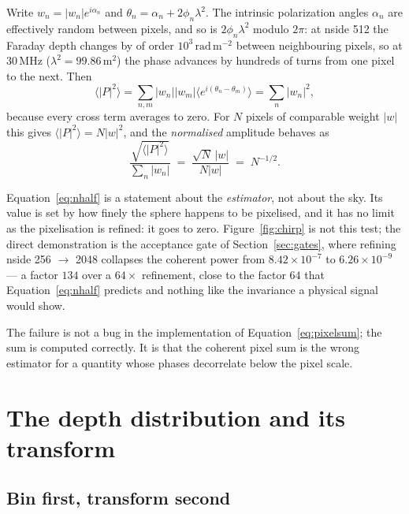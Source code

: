 \documentclass[11pt]{article}
\newcommand{\rmu}{\ensuremath{\mathrm{rad\,m^{-2}}}}
\newcommand{\lamsq}{\ensuremath{\lambda^{2}}}
\begin{document}
Write $w_n = |w_n| e^{i\alpha_n}$ and $\theta_n = \alpha_n +
2\phi_n\lamsq$. The intrinsic polarization angles $\alpha_n$ are
effectively random between pixels, and so is $2\phi_n\lamsq$ modulo
$2\pi$: at nside 512 the Faraday depth changes by of order
$10^{3}$\,\rmu{} between neighbouring pixels, so at 30\,MHz
($\lamsq = 99.86\,\mathrm{m^2}$) the phase advances by hundreds of turns
from one pixel to the next. Then
\begin{equation}
  \bigl\langle |P|^2 \bigr\rangle
  = \sum_{n,m} |w_n||w_m| \bigl\langle e^{i(\theta_n - \theta_m)}
  \bigr\rangle
  = \sum_{n} |w_n|^2 ,
  \label{eq:walk}
\end{equation}
because every cross term averages to zero. For $N$ pixels of comparable
weight $|w|$ this gives $\langle|P|^2\rangle = N|w|^2$, and the
\emph{normalised} amplitude behaves as
\begin{equation}
  \frac{\sqrt{\langle |P|^2\rangle}}{\sum_n |w_n|}
  \;=\; \frac{\sqrt{N}\,|w|}{N|w|}
  \;=\; N^{-1/2}.
  \label{eq:nhalf}
\end{equation}

Equation~\eqref{eq:nhalf} is a statement about the \emph{estimator}, not
about the sky. Its value is set by how finely the sphere happens to be
pixelised, and it has no limit as the pixelisation is refined: it goes to
zero. Figure~\ref{fig:chirp} is not this test; the direct demonstration
is the acceptance gate of Section~\ref{sec:gates}, where refining
nside 256 $\rightarrow$ 2048 collapses the coherent power from
$8.42\times10^{-7}$ to $6.26\times10^{-9}$ --- a factor $134$ over a
$64\times$ refinement, close to the factor $64$ that
Equation~\eqref{eq:nhalf} predicts and nothing like the invariance a
physical signal would show.

The failure is not a bug in the implementation of
Equation~\eqref{eq:pixelsum}; the sum is computed correctly. It is that
the coherent pixel sum is the wrong estimator for a quantity whose phases
decorrelate below the pixel scale.

\section{The depth distribution and its transform}
\label{sec:depthdist}

\subsection{Bin first, transform second}
\end{document}
